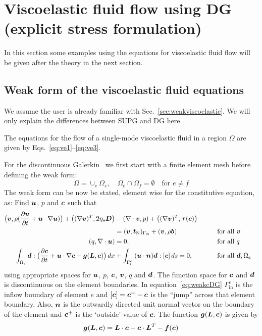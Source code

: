 
\def\headdate{28th January 2014}

\section{Viscoelastic fluid flow using DG (explicit stress formulation)}

In this section some examples using the equations for viscoelastic fluid flow
will be given after the theory in the next section.

\subsection{Weak form of the viscoelastic fluid equations}
\label{sec:DGweak}

We assume the user is already familiar with Sec.~\ref{sec:weakviscoelastic}.
We will only explain the differences between SUPG and DG here. 

The equations for the flow of a single-mode viscoelastic fluid
in a region $\Omega$ are given by Eqs.~\eqref{eq:ve1}--\eqref{eq:ve3}.

For the discontinuous Galerkin \fem\ we first start with a finite element mesh
before defining the weak form:
\[
\Omega=\cup_e\Omega_e, \quad\Omega_{e}\cap\Omega_{f}=\emptyset\quad
   \text{for }e\neq f
\]
The weak form can be now be stated, element wise for the constitutive equation,
as:
Find $\boldsymbol{u}$, $p$ and $\boldsymbol{c}$ such that
\begin{alignat}{2}
 \big(\boldsymbol{v},\rho(\dfrac{\partial \boldsymbol{u}}{\partial t}+\boldsymbol{u}\cdot\nabla\boldsymbol{u})\big) +
  \big((\nabla\boldsymbol{v})^T,2\eta_s\boldsymbol{D}\big)
    &-(\nabla\cdot\boldsymbol{v},p)+\big((\nabla\boldsymbol{v})^T,\boldsymbol{\tau}(\boldsymbol{c})\big)\notag\\
    &=(\boldsymbol{v},\boldsymbol{t}_{\text{N}})_{\Gamma_{\text{N}}}+(\boldsymbol{v},\rho\boldsymbol{b})
&\qquad&\text{for all }\boldsymbol{v}\\
  \,(q,\nabla\cdot\boldsymbol{u})&=0,&\qquad&\text{for all }q\\
 \int_{\Omega_e}\boldsymbol{d}:\big(\dfrac{\partial \boldsymbol{c}}{\partial t}
+\boldsymbol{u}\cdot\nabla\boldsymbol{c}-\boldsymbol{g}(\boldsymbol{L},\boldsymbol{c})\big)\,d x
    &+\int_{\Gamma^e_{\text{in}}}(\boldsymbol{u}\cdot\boldsymbol{n})\boldsymbol{d}:[\boldsymbol{c}]\,d s = 0,
  &\qquad&\text{for all }\boldsymbol{d},\Omega_e
   \label{eq:weakcDG}
\end{alignat}
using appropriate spaces for $\boldsymbol{u}$, $p$, $\boldsymbol{c}$, $\boldsymbol{v}$, $q$ and $\boldsymbol{d}$.
The function space for $\boldsymbol{c}$ and $\boldsymbol{d}$ is discontinuous on the
element boundaries.
In equation~\eqref{eq:weakcDG} $\Gamma^e_{\text{in}}$ is the
inflow boundary of element $e$ and
$[\boldsymbol{c}]=\boldsymbol{c}^+-\boldsymbol{c}$ is the ``jump'' across that element boundary.
Also, $\boldsymbol{n}$ is the outwardly directed unit normal vector on the boundary of
the element and $\boldsymbol{c}^+$ is
the `outside' value of $\boldsymbol{c}$.
 The function $\boldsymbol{g}(\boldsymbol{L},\boldsymbol{c})$ is given by
\begin{equation}
\boldsymbol{g}(\boldsymbol{L},\boldsymbol{c})=\boldsymbol{L}\cdot\boldsymbol{c}+\boldsymbol{c}\cdot\boldsymbol{L}^T
 -\boldsymbol{f}(\boldsymbol{c})
\end{equation}

